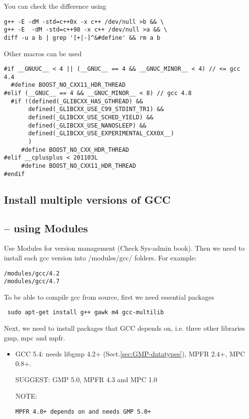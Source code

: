 You can check the difference using 
\begin{verbatim}
g++ -E -dM -std=c++0x -x c++ /dev/null >b && \
g++ -E  -dM -std=c++98 -x c++ /dev/null >a && \
diff -u a b | grep '[+|-]^&#define' && rm a b
\end{verbatim}

Other macros can be used
\begin{verbatim}
#if __GNUUC__ < 4 || (__GNUC__ == 4 && __GNUC_MINOR__ < 4) // <= gcc 4.4
  #define BOOST_NO_CXX11_HDR_THREAD
#elif (__GNUC__ == 4 && __GNUC_MINOR__ < 8) // gcc 4.8
  #if !(defined(_GLIBCXX_HAS_GTHREAD) &&
  	   defined(_GLIBCXX_USE_C99_STDINT_TR1) &&
  	   defined(_GLIBCXX_USE_SCHED_YIELD) &&
  	   defined(_GLIBCXX_USE_NANOSLEEP) &&
  	   defined(_GLIBCXX_USE_EXPERIMENTAL_CXX0X__)
  	   )
  	 #define BOOST_NO_CXX_HDR_THREAD
#elif __cplusplus < 201103L
     #define BOOST_NO_CXX11_HDR_THREAD
#endif       
\end{verbatim}

\subsection{Install multiple versions of GCC}
\subsection{-- using Modules }
\label{sec:modules_gcc}

Use Modules for version management (Check Sys-admin book). Then we need to
install each gcc version into /modules/gcc/ folders. For example:
\begin{verbatim}
/modules/gcc/4.2
/modules/gcc/4.7
\end{verbatim} 

To be able to compile gcc from source, first we need essential packages 
\begin{verbatim}
 sudo apt-get install g++ gawk m4 gcc-multilib
\end{verbatim}

Next, we need to install packages that GCC depends on, i.e. three other
libraries gmp, mpc and mpfr.
\begin{itemize}
  \item GCC 5.4: needs libgmp 4.2+ (Sect.\ref{sec:GMP-datatypes}), MPFR 2.4+,
  MPC 0.8+.

SUGGEST: GMP 5.0, MPFR 4.3 and MPC 1.0

NOTE:
\begin{verbatim}
MPFR 4.0+ depends on and needs GMP 5.0+

\end{verbatim}
  
\end{itemize}

